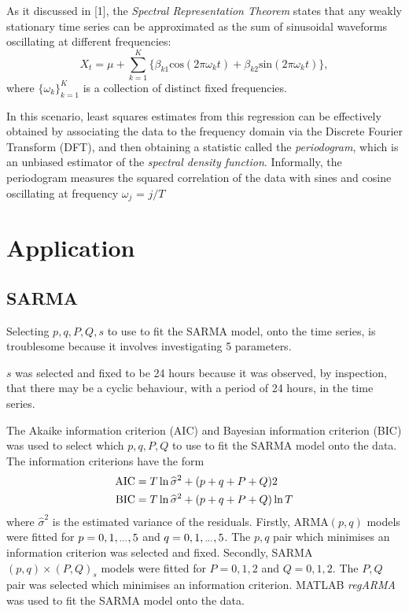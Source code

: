 \documentclass[]{article}
\newcommand{\dotdotdot}{\vphantom{.}_{\cdots}}
\begin{document}
As it discussed in [1], the \textit{Spectral Representation Theorem} states that any weakly stationary time series can be approximated as the
sum of sinusoidal waveforms oscillating at different frequencies:
\begin{equation*}
X_{t} = \mu + \sum_{k = 1}^{K} \big\{ \beta_{k 1}\text{cos}(2\pi\omega_k t) + \beta_{k 2}\text{sin}(2\pi\omega_k t) \big\},
\end{equation*}
where $\{\omega_k\}_{k = 1}^{K}$ is a collection of distinct fixed frequencies.
\vspace{0.1cm}

In this scenario, least squares estimates from this regression can be effectively obtained by associating the data to the frequency domain via the Discrete Fourier Transform (DFT), and then obtaining a statistic called the \textit{periodogram}, which is an unbiased estimator of the \textit{spectral density function}. Informally, the periodogram 
measures the squared correlation of the data with sines and cosine oscillating at frequency $\omega_j$ = $j/T$

\section{Application}
\subsection{SARMA}
Selecting $p,q,P,Q,s$ to use to fit the SARMA model, onto the time series, is troublesome because it involves investigating 5 parameters.

$s$ was selected and fixed to be 24 hours because it was observed, by inspection, that there may be a cyclic behaviour, with a period of 24 hours, in the time series.

The Akaike information criterion (AIC) and Bayesian information criterion (BIC) was used to select which $p,q,P,Q$ to use to fit the SARMA model onto the data. The information criterions have the form
\begin{align*}
\textup{AIC}&=T\ln{\widehat{\sigma}^2}+(p+q+P+Q)2\\
\textup{BIC}&=T\ln{\widehat{\sigma}^2}+(p+q+P+Q)\ln{T}
\end{align*}
where $\widehat{\sigma}^2$ is the estimated variance of the residuals. Firstly, ARMA$(p,q)$ models were fitted for $p=0,1,\dotdotdot,5$ and $q=0,1,\dotdotdot,5$. The $p,q$ pair which minimises an information criterion was selected and fixed. Secondly, SARMA$(p,q)\times(P,Q)_s$ models were fitted for $P=0,1,2$ and $Q=0,1,2$. The $P,Q$ pair was selected which minimises an information criterion. MATLAB \emph{regARMA} was used to fit the SARMA model onto the data.
\end{document}

